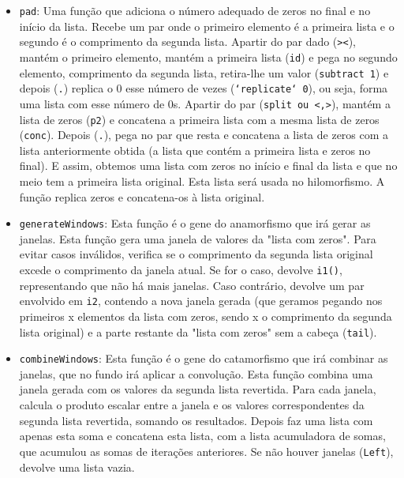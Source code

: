 \documentclass[11pt, a4paper, fleqn]{article}
\begin{document}
\begin{itemize}
    \item \texttt{pad}: Uma função que adiciona o número adequado de zeros no final e no início da lista. Recebe um par onde o primeiro elemento é a primeira lista e o segundo é o comprimento da segunda lista.
    Apartir do par dado (\texttt{><}), mantém o primeiro elemento, mantém a primeira lista (\texttt{id}) e pega no segundo elemento, comprimento da segunda lista, retira-lhe um valor (\texttt{subtract 1}) e depois
    (\texttt{.}) replica o 0 esse número de vezes (\texttt{`replicate` 0}), ou seja, forma uma lista com esse número de 0s. Apartir do par (\texttt{split ou <,>}), mantém a lista de zeros (\texttt{p2}) e concatena
    a primeira lista com a mesma lista de zeros (\texttt{conc}). Depois (\texttt{.}), pega no par que resta e concatena a lista de zeros com a lista anteriormente obtida (a lista que contém a primeira
    lista e zeros no final). E assim, obtemos uma lista com zeros no início e final da lista e que no meio tem a primeira lista original. Esta lista será usada no hilomorfismo.
    A função replica zeros e concatena-os à lista original.

    \item \texttt{generateWindows}: Esta função é o gene do anamorfismo que irá gerar as janelas. Esta função gera uma janela de valores da "lista com zeros". Para evitar casos inválidos, verifica se o comprimento da segunda lista original excede o comprimento da janela atual. Se for o caso, devolve \texttt{i1()}, representando que não há mais janelas. Caso contrário, devolve um par envolvido em \texttt{i2}, contendo a nova janela gerada
    (que geramos pegando nos primeiros x elementos da lista com zeros, sendo x o comprimento da segunda lista original) e a parte restante da "lista com zeros" sem a cabeça (\texttt{tail}).

    \item \texttt{combineWindows}: Esta função é o gene do catamorfismo que irá combinar as janelas, que no fundo irá aplicar a convolução. Esta função combina uma janela gerada com os valores da segunda lista revertida. Para cada janela, calcula o produto escalar entre a janela e os valores correspondentes da segunda lista revertida, somando os resultados. Depois faz uma lista com apenas esta soma e concatena esta lista, com a lista acumuladora de somas, que acumulou as somas de iterações anteriores. Se não houver janelas (\texttt{Left}), devolve uma lista vazia.
\end{itemize}
\end{document}
